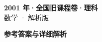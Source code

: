 \documentclass[zihao=-4, a4paper]{ctexart}
\begin{document}
\begin{center}
  {\Large\bfseries 2001 年·全国旧课程卷·理科}\\[4pt]
  {\large 数学 · 解析版}
\end{center}
\medskip
{}

\clearpage
{}
\begin{center}{\Large\bfseries 参考答案与详细解析}\end{center}
\medskip

\end{document}
